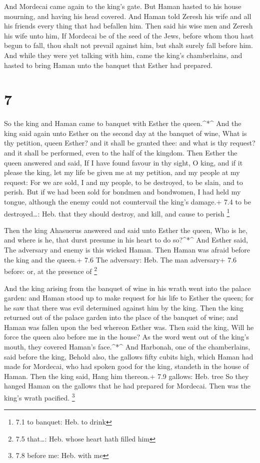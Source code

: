  And Mordecai came again to the king's gate. But Haman
hasted to his house mourning, and having his head covered. 
And Haman told Zeresh his wife and all his friends every thing that had
befallen him. Then said his wise men and Zeresh his wife unto him, If
Mordecai be of the seed of the Jews, before whom thou hast begun to
fall, thou shalt not prevail against him, but shalt surely fall before
him.  And while they were yet talking with him, came the
king's chamberlains, and hasted to bring Haman unto the banquet that
Esther had prepared.

\hypertarget{section-6}{%
\section{7}\label{section-6}}

 So the king and Haman came to banquet with Esther the
queen.\^{}*\^{}  And the king said again unto Esther on the
second day at the banquet of wine, What is thy petition, queen Esther?
and it shall be granted thee: and what is thy request? and it shall be
performed, even to the half of the kingdom.  Then Esther the
queen answered and said, If I have found favour in thy sight, O king,
and if it please the king, let my life be given me at my petition, and
my people at my request:  For we are sold, I and my people,
to be destroyed, to be slain, and to perish. But if we had been sold for
bondmen and bondwomen, I had held my tongue, although the enemy could
not countervail the king's damage.+ 7.4 to be destroyed\ldots: Heb. that
they should destroy, and kill, and cause to perish \footnote{7.1 to
  banquet: Heb. to drink}

 Then the king Ahasuerus answered and said unto Esther the
queen, Who is he, and where is he, that durst presume in his heart to do
so?\^{}*\^{}  And Esther said, The adversary and enemy is
this wicked Haman. Then Haman was afraid before the king and the queen.+
7.6 The adversary: Heb. The man adversary+ 7.6 before: or, at the
presence of \footnote{7.5 that\ldots: Heb. whose heart hath filled him}

 And the king arising from the banquet of wine in his wrath
went into the palace garden: and Haman stood up to make request for his
life to Esther the queen; for he saw that there was evil determined
against him by the king.  Then the king returned out of the
palace garden into the place of the banquet of wine; and Haman was
fallen upon the bed whereon Esther was. Then said the king, Will he
force the queen also before me in the house? As the word went out of the
king's mouth, they covered Haman's face.\^{}*\^{}  And
Harbonah, one of the chamberlains, said before the king, Behold also,
the gallows fifty cubits high, which Haman had made for Mordecai, who
had spoken good for the king, standeth in the house of Haman. Then the
king said, Hang him thereon.+ 7.9 gallows: Heb. tree  So
they hanged Haman on the gallows that he had prepared for Mordecai. Then
was the king's wrath pacified. \footnote{7.8 before me: Heb. with me}

